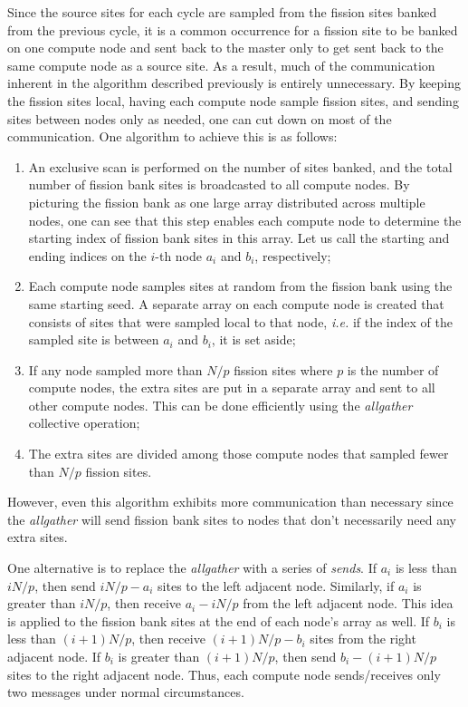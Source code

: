 \documentclass[11pt]{article}
\begin{document}
Since the source sites for each cycle are sampled from the fission
sites banked from the previous cycle, it is a common occurrence for a
fission site to be banked on one compute node and sent back to the
master only to get sent back to the same compute node as a source
site. As a result, much of the communication inherent in the algorithm
described previously is entirely unnecessary. By keeping the fission
sites local, having each compute node sample fission sites, and
sending sites between nodes only as needed, one can cut down on most
of the communication. One algorithm to achieve this is as follows:

\begin{enumerate}
\item An exclusive scan is performed on the number of sites banked,
  and the total number of fission bank sites is broadcasted to all
  compute nodes. By picturing the fission bank as one large array
  distributed across multiple nodes, one can see that this step
  enables each compute node to determine the starting index of fission
  bank sites in this array. Let us call the starting and ending
  indices on the $i$-th node $a_i$ and $b_i$, respectively;
\item Each compute node samples sites at random from the fission bank
  using the same starting seed. A separate array on each compute node
  is created that consists of sites that were sampled local to that
  node, {\em i.e.} if the index of the sampled site is between $a_i$
  and $b_i$, it is set aside;
\item If any node sampled more than $N/p$ fission sites where $p$ is
  the number of compute nodes, the extra sites are put in a separate
  array and sent to all other compute nodes. This can be done
  efficiently using the \emph{allgather} collective operation;
\item The extra sites are divided among those compute nodes that
  sampled fewer than $N/p$ fission sites.
\end{enumerate}

However, even this algorithm exhibits more communication than
necessary since the \emph{allgather} will send fission bank sites to
nodes that don't necessarily need any extra sites.

One alternative is to replace the \emph{allgather} with a series of
\emph{sends}. If $a_i$ is less than $iN/p$, then send $iN/p - a_i$
sites to the left adjacent node. Similarly, if $a_i$ is greater than
$iN/p$, then receive $a_i - iN/p$ from the left adjacent node. This
idea is applied to the fission bank sites at the end of each node's
array as well. If $b_i$ is less than $(i+1)N/p$, then receive
$(i+1)N/p - b_i$ sites from the right adjacent node. If $b_i$ is
greater than $(i+1)N/p$, then send $b_i - (i+1)N/p$ sites to the right
adjacent node. Thus, each compute node sends/receives only two
messages under normal circumstances.
\end{document}
